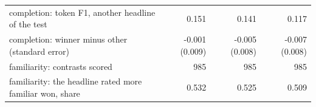 \begin{tabular}{p{7.6cm}rrr}
completion: token F1, another headline of the test & 0.151 & 0.141 & 0.117 \\
completion: winner minus other (standard error) & -0.001 (0.009) & -0.005 (0.008) & -0.007 (0.008) \\
familiarity: contrasts scored & 985 & 985 & 985 \\
familiarity: the headline rated more familiar won, share & 0.532 & 0.525 & 0.509 \\

\end{tabular}
